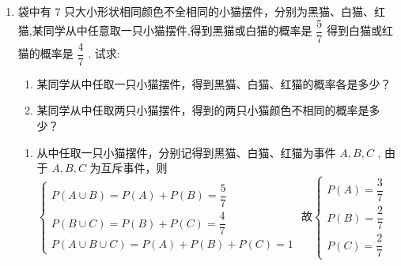 \begin{enumerate}
\begin{enumerate}
\begin{jieda}
\begin{enumerate}
                对于事件 $B$ ,则 $\left\{  \begin{matrix} m > 0 \\  \dfrac{n}{2m} \geq  0 \end{matrix}\right.$ ,则 $\left\{  \begin{matrix} m > 0 \\  n \geq  0 \end{matrix}\right.$ ,满足事件 $B$ 的数对 $\left( {m,n}\right)$ 有 $\left( {1,4}\right) ,\left( {1,9}\right) ,\left( {2,4}\right) ,\left( {2,9}\right) ,\left( {3,4}\right) ,\left( {3,9}\right)$ , 共 6 个，故 $P\left( B\right)  = \dfrac{6}{16} = \dfrac{3}{8}$

                \item 由 (2) 可知,事件 $A$ 发生时有 $n \leq   - {8m} < 0$ ,事件 $B$ 发生时有 $\left\{  \begin{array}{l} m > 0 \\  n \geq  0 \end{array}\right.$ ,则事件 $A$ 与事件 $B$ 互斥, 则事件 $A$ 、事件 $B$ 至少一个发生的概率 $P = P\left( A\right)  + P\left( B\right)  = \dfrac{9}{16}$
            \end{enumerate}
        \end{jieda}
        \item 袋中有 7 只大小形状相同颜色不全相同的小猫摆件，分别为黑猫、白猫、红猫,某同学从中任意取一只小猫摆件,得到黑猫或白猫的概率是 $\dfrac{5}{7}$ 得到白猫或红猫的概率是 $\dfrac{4}{7}$ . 试求:
        \begin{enumerate}
            \item 某同学从中任取一只小猫摆件，得到黑猫、白猫、红猫的概率各是多少？
            \item 某同学从中任取两只小猫摆件，得到的两只小猫颜色不相同的概率是多少？
        \end{enumerate}
        \begin{jieda}
            \begin{enumerate}
                \item 从中任取一只小猫摆件，分别记得到黑猫、白猫、红猫为事件 $A,B,C$ , 由于 $A,B,C$ 为互斥事件，则$\left\{\begin{array}{l}
                     P\left( {A \cup B}\right)  = P\left( A\right)  + P\left( B\right)  = \dfrac{5}{7}  \\
                     P\left( {B \cup C}\right)  = P\left( B\right)  + P\left( C\right)  = \dfrac{4}{7}  \\
                     P\left( {A \cup B \cup C}\right)  = P\left( A\right)  + P\left( B\right)  + P\left( C\right)  = 1
                \end{array}\right.$
                故$\left\{\begin{array}{l}
                     P\left( A\right)  = \dfrac{3}{7}  \\
                     P\left( B\right)  = \dfrac{2}{7} \\
                     P\left( C\right)  = \dfrac{2}{7} 
                \end{array}\right.$


\end{enumerate}
\end{jieda}
\end{enumerate}
\end{enumerate}
